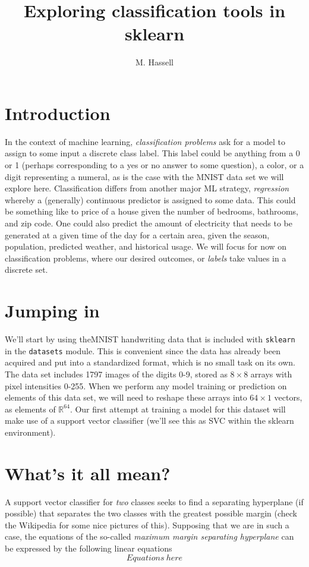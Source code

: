 \documentclass[]{article}
\title{Exploring classification tools in sklearn}
\author{M. Hassell}
\begin{document}
\maketitle

\section{Introduction}

In the context of machine learning, {\it classification problems} ask for a model to assign to some input a discrete class label.  This label could be anything from a 0 or 1 (perhaps corresponding to a yes or no answer to some question), a color, or a digit representing a numeral, as is the case with the MNIST data set we will explore here.  Classification differs from another major ML strategy, {\it regression} whereby a (generally) continuous predictor is assigned to some data.  This could be something like to price of a house given the number of bedrooms, bathrooms, and zip code.  One could also predict the amount of electricity that needs to be generated at a given time of the day for a certain area, given the season, population, predicted weather, and historical usage.  We will focus for now on classification problems, where our desired outcomes, or {\it labels} take values in a discrete set.

\section{Jumping in}

We'll start by using theMNIST handwriting data that is included with {\tt sklearn} in the {\tt datasets} module.  This is convenient since the data has already been acquired and put into a standardized format, which is no small task on its own.   The data set includes 1797 images of the digits 0-9, stored as $8 \times 8$ arrays with pixel intensities 0-255.  When we perform any model training or prediction on elements of this data set, we will need to reshape these arrays into $64 \times 1$ vectors, as elements of $\mathbb{R}^{64}$.   Our first attempt at training a model for this dataset will make use of a support vector classifier (we'll see this as SVC within the sklearn environment).

\section{What's it all mean?}

A support vector classifier for {\it two} classes seeks to find a separating hyperplane (if possible) that separates the two classes with the greatest possible margin (check the Wikipedia for some nice pictures of this).  Supposing that we are in such a case, the equations of the so-called {\it maximum margin separating hyperplane} can be expressed by the following linear equations
$$
Equations~here
$$
\end{document}
